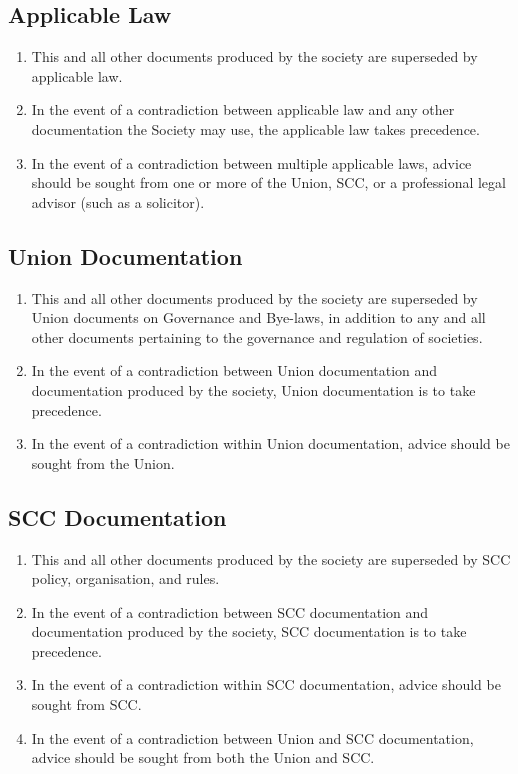 \documentclass{scrartcl}
\begin{document}
        \subsection{Applicable Law}
            \label{documentation--applicable-law}
            \begin{enumerate}
                \item This and all other documents produced by the society are superseded by applicable law.
                \item In the event of a contradiction between applicable law and any other documentation the Society may use, the applicable law takes precedence.
                \item In the event of a contradiction between multiple applicable laws, advice should be sought from one or more of the Union, SCC, or a professional legal advisor (such as a solicitor).
            \end{enumerate}


        \subsection{Union Documentation}
            \label{documentation--union}
            \begin{enumerate}
                \item This and all other documents produced by the society are superseded by Union documents on Governance and Bye-laws, in addition to any and all other documents pertaining to the governance and regulation of societies.
                \item In the event of a contradiction between Union documentation and documentation produced by the society, Union documentation is to take precedence.
                \item In the event of a contradiction within Union documentation, advice should be sought from the Union.
            \end{enumerate}

        \subsection{SCC Documentation}
            \label{documentation--scc}
            \begin{enumerate}
                \item This and all other documents produced by the society are superseded by SCC policy, organisation, and rules.
                \item In the event of a contradiction between SCC documentation and documentation produced by the society, SCC documentation is to take precedence.
                \item In the event of a contradiction within SCC documentation, advice should be sought from SCC.
                \item In the event of a contradiction between Union and SCC documentation, advice should be sought from both the Union and SCC.
            \end{enumerate}
\end{document}
